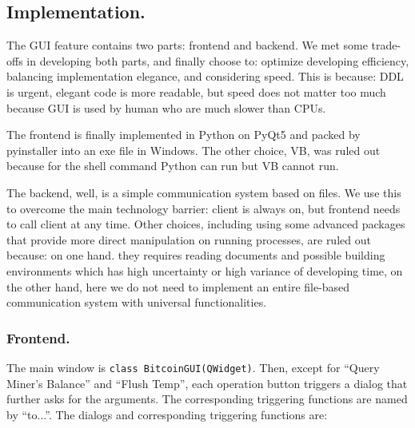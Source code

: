 \documentclass[12pt]{article}
\begin{document}

\subsection*{Implementation.}

The GUI feature contains two parts: frontend and backend. We met some trade-offs in developing both parts, and finally choose to: optimize developing efficiency, balancing implementation elegance, and considering speed. This is because: DDL is urgent, elegant code is more readable, but speed does not matter too much because GUI is used by human who are much slower than CPUs.

The frontend is finally implemented in Python on PyQt5 and packed by pyinstaller into an exe file in Windows. The other choice, VB, was ruled out because for the shell command Python can run but VB cannot run.

The backend, well, is a simple communication system based on files. We use this to overcome the main technology barrier: client is always on, but frontend needs to call client at any time. Other choices, including using some advanced packages that provide more direct manipulation on running processes, are ruled out because: on one hand. they requires reading documents and possible building environments which has high uncertainty or high variance of developing time, on the other hand, here we do not need to implement an entire file-based communication system with universal functionalities.

\subsubsection*{Frontend.}

The main window is \texttt{class BitcoinGUI(QWidget)}. Then, except for ``Query Miner's Balance'' and ``Flush Temp'', each operation button triggers a dialog that further asks for the arguments. The corresponding triggering functions are named by ``to...''. The dialogs and corresponding triggering functions are:
\end{document}
